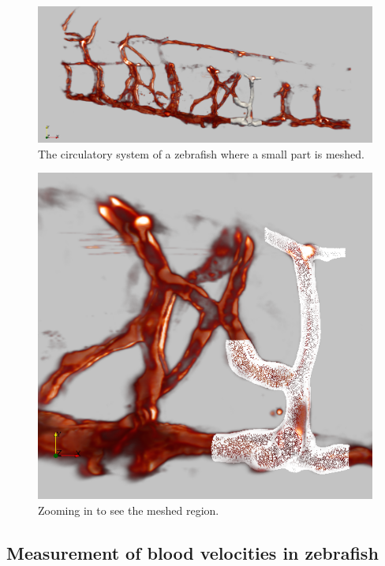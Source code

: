 \documentclass[epsfig,11pt]{article}
\begin{document}
 \begin{figure}[h!] 
\begin{center}
  \includegraphics[scale=0.3]{overview2.png}
  \end{center}
  \caption{The circulatory system of a zebrafish where a small part is meshed.}
\end{figure}

\begin{figure}[h!] 
\begin{center}
  \includegraphics[scale=0.3]{zoomed2.png}
  \end{center}
  \caption{Zooming in to see the meshed region.}
\end{figure}

\subsection{Measurement of blood velocities in zebrafish}
\end{document}
